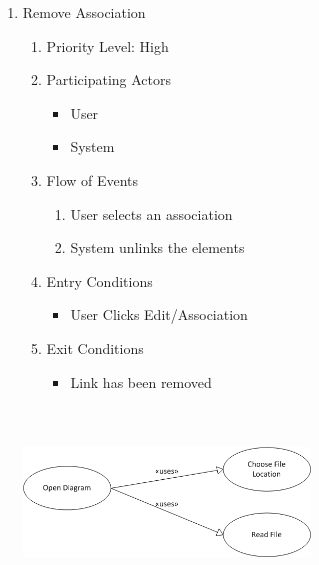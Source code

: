 \documentclass[a4paper, 12pt]{article}
\begin{document}
\begin{enumerate}
\item Remove Association
  \begin {enumerate}
  \item Priority Level: High
  \item Participating Actors
    \begin {itemize}
    \item User
    \item System
    \end {itemize}
  \item Flow of Events
    \begin {enumerate}
    \item User selects an association
    \item System unlinks the elements
    \end {enumerate}
  \item Entry Conditions
    \begin {itemize}
    \item User Clicks Edit/Association
    \end {itemize}
  \item Exit Conditions
    \begin {itemize}
    \item Link has been removed
    \end {itemize}
  \end {enumerate}

  \begin{center}
    \includegraphics[height=2in, width=3in]{img/OpenDiagram.png}
  \end{center}


\end{enumerate}
\end{document}

